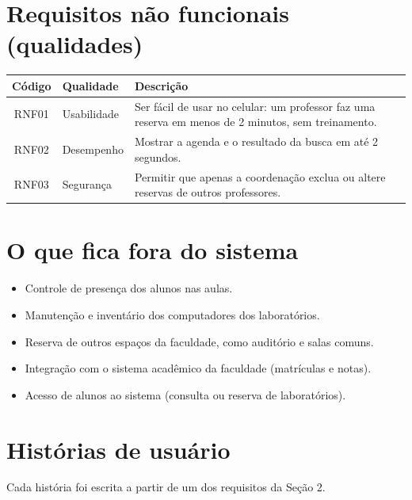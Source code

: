 \documentclass[a4paper,12pt]{article}
\begin{document}
\section{Requisitos não funcionais (qualidades)}

\begin{xltabular}{\linewidth}{|c|l|Y|}
  \hline
  \textbf{Código} & \textbf{Qualidade} & \textbf{Descrição} \\ \hline
  RNF01 & Usabilidade & Ser fácil de usar no celular: um professor faz uma reserva em menos de 2 minutos, sem treinamento. \\ \hline
  RNF02 & Desempenho  & Mostrar a agenda e o resultado da busca em até 2 segundos. \\ \hline
  RNF03 & Segurança   & Permitir que apenas a coordenação exclua ou altere reservas de outros professores. \\ \hline
\end{xltabular}

\section{O que fica fora do sistema}

\begin{itemize}[leftmargin=1.2cm]
  \item Controle de presença dos alunos nas aulas.
  \item Manutenção e inventário dos computadores dos laboratórios.
  \item Reserva de outros espaços da faculdade, como auditório e salas comuns.
  \item Integração com o sistema acadêmico da faculdade (matrículas e notas).
  \item Acesso de alunos ao sistema (consulta ou reserva de laboratórios).
\end{itemize}

\section{Histórias de usuário}

Cada história foi escrita a partir de um dos requisitos da Seção 2.
\end{document}
